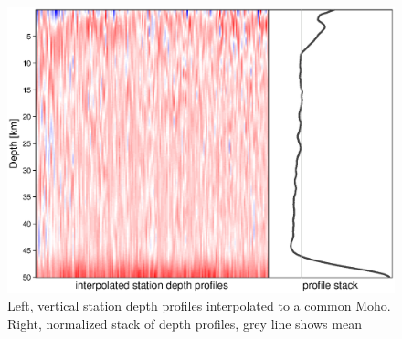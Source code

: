 \documentclass[review]{elsarticle}
\begin{document}
\begin{figure}
 \centering
 \includegraphics[width=\textwidth]{discInterp.eps}
 \caption{Left, vertical station depth profiles interpolated to a common Moho. Right, normalized stack of depth profiles, grey line shows mean}
 \label{fig:discInterp}
\end{figure}
\end{document}
